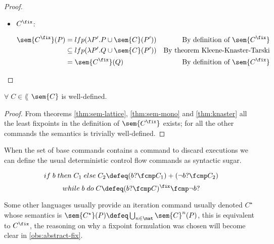 \begin{definition}
\begin{proof}
\begin{itemize}
      \item $C^\fix$:

        \begin{align*}
          \sem{C^\fix}(P) 
            &= lfp(\lambda P'. P \cup \sem{C}(P'))
            &\text{By definition of $\sem{C^\fix}$}\\
            &\subseteq lfp(\lambda P'. Q \cup \sem{C}(P'))
            &\text{By theorem Kleene-Knaster-Tarski}\\
            &= \sem{C^\fix}(Q) 
            &\text{By definition of $\sem{C^\fix}$}\\
        \end{align*}

    \end{itemize}

  \end{proof}

  \begin{lemma}
    $\forall \; C \in \lang$ $\sem{C}$ is well-defined.
  \end{lemma}
  \begin{proof}
    From theorems \ref{thm:sem-lattice}, \ref{thm:sem-mono} and 
    \ref{thm:knaster} all the least fixpoints in the definition of 
    $\sem{C^\fix}$ exists; for all the other commands the semantics is 
    trivially well-defined.
  \end{proof}

  \begin{observation}
    When the set of base commands contains a command to discard executions we
    can define the usual deterministic control flow commands as syntactic sugar.

    $$if \; b \; then \; C_1 \; else \; C_2 \defeq (b ? \fcmp C_1) 
    + (\neg b ? \fcmp C_2)$$
    $$while \; b \; do \; C \defeq (b? \fcmp C)^\fix \fcmp \neg b ?$$
  \end{observation}

  \begin{observation}
    Some other languages usually provide an iteration command usually denoted
    $C^\star$ whose semantics is $\sem{C^\star}(P) \defeq \bigcup_{n \in \nat}
    \sem{C}^n(P)$, this is equivalent to $C^\fix$, the reasoning on why a
    fixpoint formulation was chosen will become clear in 
    \ref{obs:abstract-fix}.
  \end{observation}

\end{definition}

